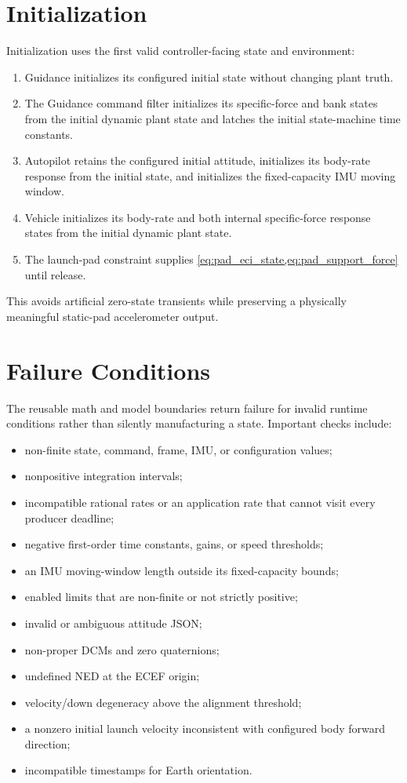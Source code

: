 \section{Initialization}

Initialization uses the first valid controller-facing state and environment:
\begin{enumerate}
    \item Guidance initializes its configured initial state without changing plant truth.
    \item The Guidance command filter initializes its specific-force and bank
          states from the initial dynamic plant state and latches the initial
          state-machine time constants.
    \item Autopilot retains the configured initial attitude, initializes its
          body-rate response from the initial state, and initializes the
          fixed-capacity IMU moving window.
    \item Vehicle initializes its body-rate and both internal specific-force
          response states from the initial dynamic plant state.
    \item The launch-pad constraint supplies
          \cref{eq:pad_eci_state,eq:pad_support_force} until release.
\end{enumerate}
This avoids artificial zero-state transients while preserving a physically
meaningful static-pad accelerometer output.

\section{Failure Conditions}

The reusable math and model boundaries return failure for invalid runtime
conditions rather than silently manufacturing a state. Important checks
include:
\begin{itemize}
    \item non-finite state, command, frame, IMU, or configuration values;
    \item nonpositive integration intervals;
    \item incompatible rational rates or an application rate that cannot visit
          every producer deadline;
    \item negative first-order time constants, gains, or speed thresholds;
    \item an IMU moving-window length outside its fixed-capacity bounds;
    \item enabled limits that are non-finite or not strictly positive;
    \item invalid or ambiguous attitude JSON;
    \item non-proper DCMs and zero quaternions;
    \item undefined NED at the ECEF origin;
    \item velocity/down degeneracy above the alignment threshold;
    \item a nonzero initial launch velocity inconsistent with configured body
          forward direction;
    \item incompatible timestamps for Earth orientation.
\end{itemize}

